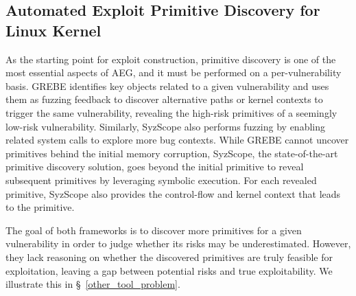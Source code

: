 \subsection{Automated Exploit Primitive Discovery for Linux Kernel}
As the starting point for exploit construction, primitive discovery is one of the most essential aspects of AEG, and it must be performed on a per-vulnerability basis. GREBE \cite{lin2022grebe} identifies key objects related to a given vulnerability and uses them as fuzzing feedback to discover alternative paths or kernel contexts to trigger the same vulnerability, revealing the high-risk primitives of a seemingly low-risk vulnerability.
Similarly, SyzScope \cite{zou2022syzscope} also performs fuzzing by enabling related system calls to explore more bug contexts.
While GREBE cannot uncover primitives behind the initial memory corruption, SyzScope, the state-of-the-art primitive discovery solution, goes beyond the initial primitive to reveal subsequent primitives by leveraging symbolic execution. For each revealed primitive, SyzScope also provides the control-flow and kernel context that leads to the primitive.

The goal of both frameworks is to discover more primitives for a given vulnerability in order to judge whether its risks may be underestimated. However, they lack reasoning on whether the discovered primitives are truly feasible for exploitation, leaving a gap between potential risks and true exploitability. We illustrate this in \S~\ref{other_tool_problem}.










